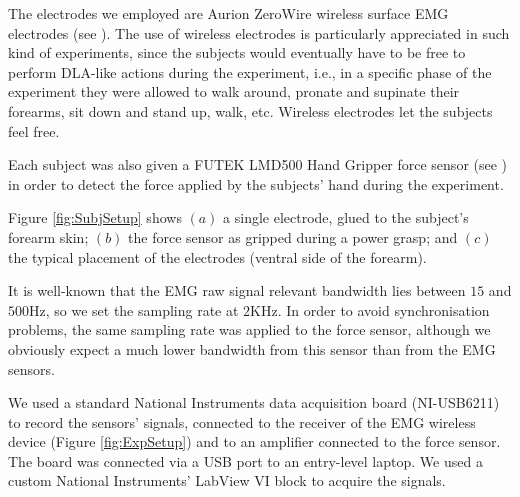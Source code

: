 \documentclass[10pt]{bmc_article}
\def\texttt{[image: ]}
\newenvironment{bmcformat}{\begin{raggedright}\baselineskip20pt\sloppy\setboolean{publ}{false}}{\end{raggedright}\baselineskip20pt\sloppy}
\begin{document}
\begin{bmcformat}

The electrodes we employed are Aurion ZeroWire wireless surface EMG
electrodes (see \cite{zerowire}). The use of wireless electrodes is
particularly appreciated in such kind of experiments, since the
subjects would eventually have to be free to perform DLA-like actions
during the experiment, i.e., in a specific phase of the experiment
they were allowed to walk around, pronate and supinate their forearms,
sit down and stand up, walk, etc. Wireless electrodes let the subjects
feel free.

Each subject was also given a FUTEK LMD500 Hand Gripper force sensor
(see \cite{LMD500}) in order to detect the force applied by the subjects'
hand during the experiment.

Figure \ref{fig:SubjSetup} shows $(a)$ a single electrode, glued to
the subject's forearm skin; $(b)$ the force sensor as gripped during a
power grasp; and $(c)$ the typical placement of the electrodes
(ventral side of the forearm).

It is well-known that the EMG raw signal relevant bandwidth lies
between $15$ and $500$Hz, so we set the sampling rate at $2$KHz. In
order to avoid synchronisation problems, the same sampling rate was
applied to the force sensor, although we obviously expect a much lower
bandwidth from this sensor than from the EMG sensors.

We used a standard National Instruments data acquisition board
(NI-USB6211) to record the sensors' signals, connected to the receiver
of the EMG wireless device (Figure \ref{fig:ExpSetup}) and to an
amplifier connected to the force sensor. The board was connected via a
USB port to an entry-level laptop. We used a custom National
Instruments' LabView VI block to acquire the signals.


\end{bmcformat}
\end{document}
